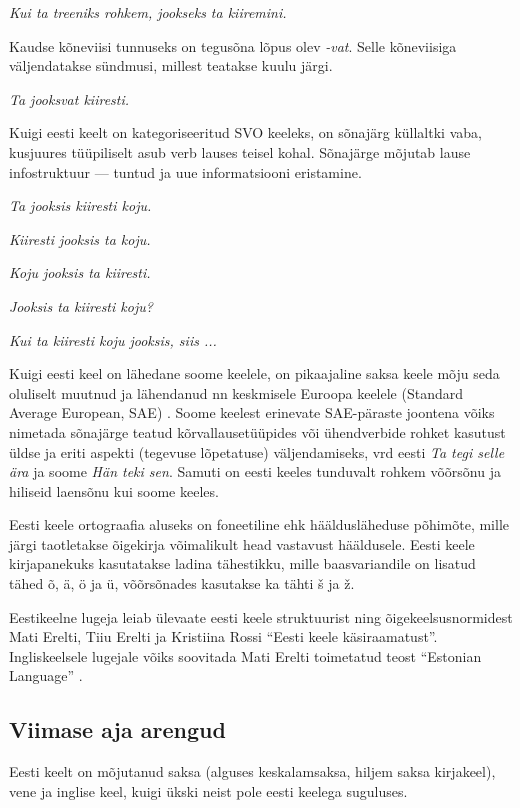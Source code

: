 \begin{multicols}{2}
\textit{Kui ta treeniks rohkem, jookseks ta kiire\-mini.}

Kaudse kõneviisi tunnuseks on tegusõna lõpus olev \textit{-vat}. 
Selle kõneviisiga väljendatakse sündmusi, millest teatakse kuulu järgi.

\textit{Ta jooksvat kiiresti.} 

Kuigi eesti keelt on kategoriseeritud SVO keeleks, on sõnajärg küllaltki vaba, kusjuures tüüpiliselt asub verb lauses teisel kohal. 
Sõnajärge mõjutab lause infostruktuur --- tuntud ja uue informatsiooni eristamine.

\textit{Ta jooksis kiiresti koju.} 	

\textit{Kiiresti jooksis ta koju.} 	

\textit{Koju jooksis ta kiiresti.} 	

\textit{Jooksis ta kiiresti koju?} 	

\textit{Kui ta kiiresti koju jooksis, siis ...} 

Kuigi eesti keel on lähedane soome keelele, on pikaajaline saksa keele mõju seda oluliselt muutnud ja lähendanud nn kesk\-misele Euroopa keelele (Standard Average European, SAE) \cite{Metslang09}.
Soome keelest erinevate SAE-päraste joontena võiks nimetada sõnajärge teatud kõrvallausetüüpides või ühendverbide rohket kasutust üldse ja eriti aspekti (tegevuse lõpetatuse) väljendamiseks, vrd eesti \textit{Ta tegi selle ära} ja soome \textit{Hän teki sen}. 
Samuti on eesti keeles tunduvalt rohkem  võõrsõnu ja hiliseid laensõnu kui soome keeles.

Eesti keele ortograafia aluseks on foneetiline ehk hääldusläheduse põhimõte, mille järgi taotletakse õigekirja võimalikult head vastavust hääldusele. 
Eesti keele kirjapanekuks kasutatakse ladina tähestikku, mille baasvariandile on lisatud tähed õ, ä, ö ja ü, võõrsõnades kasutakse ka tähti š ja ž.

Eestikeelne lugeja leiab ülevaate eesti keele struktuurist ning
õigekeelsusnormidest Mati Erelti, Tiiu Erelti ja Kristiina Rossi
``Eesti keele käsiraamatust''\cite{ereltetal2007}. %
Ingliskeelsele lugejale võiks soovitada Mati Erelti toimetatud teost ``Estonian Language'' \cite{erelt2003}. %


\subsection{Viimase aja arengud}

Eesti keelt on mõjutanud saksa (alguses keskalamsaksa, hiljem saksa kirjakeel), vene ja inglise keel, kuigi ükski neist pole eesti keelega suguluses.


\end{multicols}
